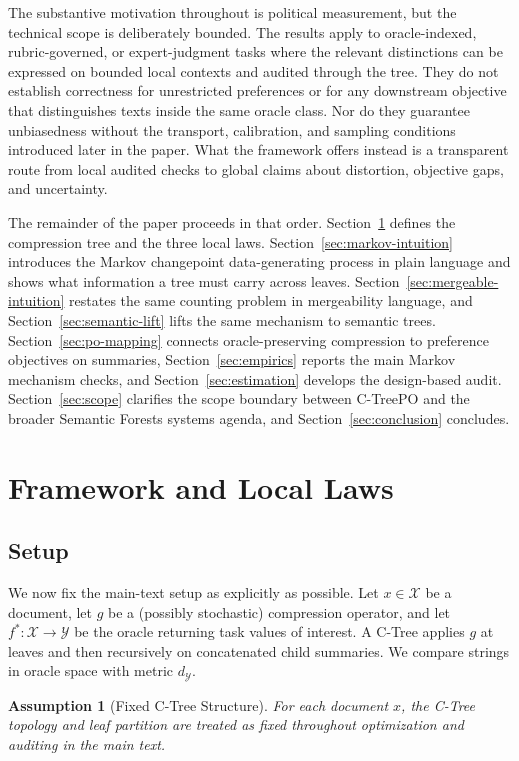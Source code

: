 \documentclass[11pt]{article}
\newtheorem{assumption}{Assumption}
\newcommand{\X}{\mathcal{X}}
\newcommand{\Y}{\mathcal{Y}}
\newcommand{\metric}{d_{\Y}}
\newcommand{\fstar}{f^\ast}
\begin{document}
The substantive motivation throughout is political measurement, but the technical scope is deliberately bounded. The results apply to oracle-indexed, rubric-governed, or expert-judgment tasks where the relevant distinctions can be expressed on bounded local contexts and audited through the tree. They do not establish correctness for unrestricted preferences or for any downstream objective that distinguishes texts inside the same oracle class. Nor do they guarantee unbiasedness without the transport, calibration, and sampling conditions introduced later in the paper. What the framework offers instead is a transparent route from local audited checks to global claims about distortion, objective gaps, and uncertainty.

The remainder of the paper proceeds in that order. Section~\ref{sec:framework} defines the compression tree and the three local laws. Section~\ref{sec:markov-intuition} introduces the Markov changepoint data-generating process in plain language and shows what information a tree must carry across leaves. Section~\ref{sec:mergeable-intuition} restates the same counting problem in mergeability language, and Section~\ref{sec:semantic-lift} lifts the same mechanism to semantic trees. Section~\ref{sec:po-mapping} connects oracle-preserving compression to preference objectives on summaries, Section~\ref{sec:empirics} reports the main Markov mechanism checks, and Section~\ref{sec:estimation} develops the design-based audit. Section~\ref{sec:scope} clarifies the scope boundary between C-TreePO and the broader Semantic Forests systems agenda, and Section~\ref{sec:conclusion} concludes.

\section{Framework and Local Laws}\label{sec:framework}

\subsection{Setup}

We now fix the main-text setup as explicitly as possible. Let $x\in\X$ be a document, let $g$ be a (possibly stochastic) compression operator, and let $\fstar:\X\to\Y$ be the oracle returning task values of interest. A C-Tree applies $g$ at leaves and then recursively on concatenated child summaries. We compare strings in oracle space with metric $\metric$.

\begin{assumption}[Fixed C-Tree Structure]\label{ass:fixed-structure}
For each document $x$, the C-Tree topology and leaf partition are treated as fixed throughout optimization and auditing in the main text.
\end{assumption}
\end{document}
